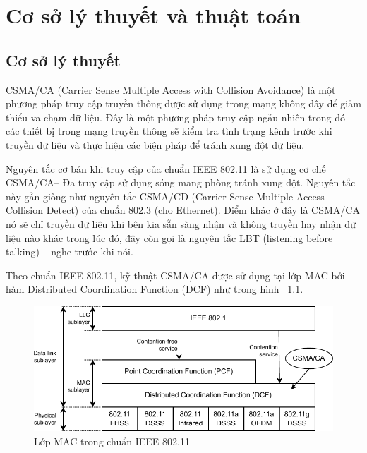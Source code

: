 \chapter{Cơ sở lý thuyết và thuật toán}
\label{ch::chapter2}
\section{Cơ sở lý thuyết}

CSMA/CA (Carrier Sense Multiple Access with Collision Avoidance) là một phương pháp truy cập truyền 
thông được sử dụng trong mạng không dây để giảm thiểu va chạm dữ liệu. Đây là một phương pháp truy 
cập ngẫu nhiên trong đó các thiết bị trong mạng truyền thông sẽ kiểm tra tình trạng kênh trước khi 
truyền dữ liệu và thực hiện các biện pháp để tránh xung đột dữ liệu.

Nguyên tắc cơ bản khi truy cập của chuẩn IEEE 802.11 là sử dụng cơ chế CSMA/CA– Đa truy cập sử dụng sóng 
mang phòng tránh xung đột. Nguyên tắc này gần giống như nguyên tắc CSMA/CD (Carrier Sense Multiple 
Access Collision Detect) của chuẩn 802.3 (cho Ethernet). Điểm khác ở đây là CSMA/CA nó sẽ chỉ truyền 
dữ liệu khi bên kia sẵn sàng nhận và không truyền hay nhận dữ liệu nào khác trong lúc đó, đây còn gọi 
là nguyên tắc LBT (listening before talking) – nghe trước khi nói.

Theo chuẩn IEEE 802.11, kỹ thuật CSMA/CA được sử dụng tại lớp MAC bởi hàm Distributed Coordination Function (DCF) như trong hình ~\ref{fig:mac}.
\begin{figure}[h]
    \centering
    \includegraphics[width=0.65\linewidth]{figures/Chapter2/MAClayer_k2opt.pdf}
    \caption{Lớp MAC trong chuẩn IEEE 802.11}
    \label{fig:mac}
\end{figure}
